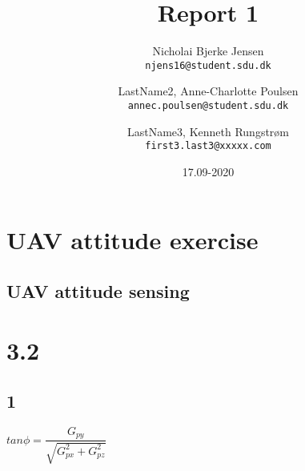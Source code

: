 \documentclass[a4paper,11pt]{article}
\begin{document}
\author{
  Nicholai Bjerke Jensen \\
  \texttt{njens16@student.sdu.dk}
  \and LastName2,
  Anne-Charlotte Poulsen\\
  \texttt{annec.poulsen@student.sdu.dk}
  \and LastName3,
  Kenneth Rungstrøm\\
  \texttt{first3.last3@xxxxx.com}

}
\title{Report 1}
\date{17.09-2020}
\maketitle
\section{}
\section{}
\section{UAV attitude exercise}
\subsection{UAV attitude sensing}


\section{3.2}

\subsection{1}
 
$tan \phi = \dfrac{G_{py}}{\sqrt{G_{px}^2 + G_{pz}^2}}$
\end{document}
